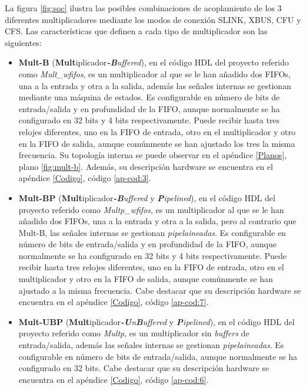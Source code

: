 La figura \ref{fig:soc} ilustra las posibles combinaciones de acoplamiento de los 3 diferentes multiplicadores mediante los modos de conexión SLINK, XBUS, CFU y CFS.
Las características que definen a cada tipo de multiplicador son las siguientes:

\begin{itemize}
    \item \textbf{Mult-B} (\textbf{Mult}iplicador\textit{\textbf{-B}uffered}), en el código HDL del proyecto referido como \textit{Mult\_wfifos}, es un multiplicador al que se le han añadido dos FIFOs, una a la entrada y otra a la salida, además las señales internas se gestionan mediante una máquina de estados. 
Es configurable en número de bits de entrada/salida y en profundidad de la FIFO, aunque normalmente se ha configurado en 32 bits y 4 bits respectivamente.
Puede recibir hasta tres relojes diferentes, uno en la FIFO de entrada, otro en el multiplicador y otro en la FIFO de salida, aunque comúnmente se han ajustado los tres la misma frecuencia.
Su topología interna se puede observar en el apéndice \ref{Planos}, plano \ref{fig:mult-b}.
Además, su descripción hardware se encuentra en el apéndice \ref{Codigo}, código \ref{ap-cod:3}.
\item \textbf{Mult-BP} (\textbf{Mult}iplicador\textit{\textbf{-B}uffered} y \textit{\textbf{P}ipelined}), en el código HDL del proyecto referido como \textit{Multp\_wfifos}, es un multiplicador al que se le han añadido dos FIFOs, una a la entrada y otra a la salida, pero al contrario que Mult-B, las señales internas se gestionan \textit{pipelaineadas}.
Es configurable en número de bits de entrada/salida y en profundidad de la FIFO, aunque normalmente se ha configurado en 32 bits y 4 bits respectivamente.
Puede recibir hasta tres relojes diferentes, uno en la FIFO de entrada, otro en el multiplicador y otro en la FIFO de salida, aunque comúnmente se han ajustado a la misma frecuencia.
Cabe destacar que su descripción hardware se encuentra en el apéndice \ref{Codigo}, código \ref{ap-cod:7}.
\item \textbf{Mult-UBP} (\textbf{Mult}iplicador\textit{\textbf{-U}n\textbf{B}uffered} y \textit{\textbf{P}ipelined}), en el código HDL del proyecto referido como \textit{Multp}, es un multiplicador sin \textit{buffers} de entrada/salida, además las señales internas se gestionan \textit{pipelaineadas}.
Es configurable en número de bits de entrada/salida, aunque normalmente se ha configurado en 32 bits.
Cabe destacar que su descripción hardware se encuentra en el apéndice \ref{Codigo}, código \ref{ap-cod:6}.
\end{itemize}

